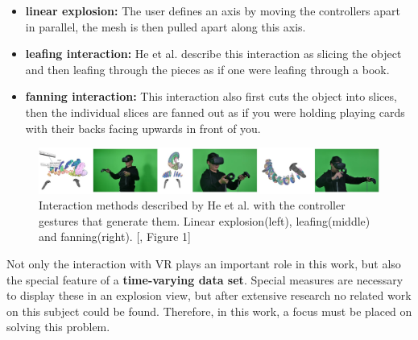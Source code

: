 \begin{itemize}
	\item \textbf{linear explosion:} The user defines an axis by moving the controllers apart in parallel, the mesh is then pulled apart along this axis.
	\item \textbf{leafing interaction:} He et al. describe this interaction as slicing the object and then leafing through the pieces as if one were leafing through a book.
	\item \textbf{fanning interaction:} This interaction also first cuts the object into slices, then the individual slices are fanned out as if you were holding playing cards with their backs facing upwards in front of you.\cite{He2017}
\end{itemize}
\begin{figure}[h]
	\centering
	\includegraphics[width=1\linewidth]{fig/Images/He_fig1}
	\caption[]{Interaction methods described by He et al. with the controller gestures that generate them. Linear explosion(left), leafing(middle) and fanning(right). [\cite{He2017}, Figure 1]}
	\label{fig:He_interactions}
\end{figure}
Not only the interaction with VR plays an important role in this work, but also the special feature of a \textbf{time-varying data set}. 
Special measures are necessary to display these in an explosion view, but after extensive research no related work on this subject could be found. 
Therefore, in this work, a focus must be placed on solving this problem.

